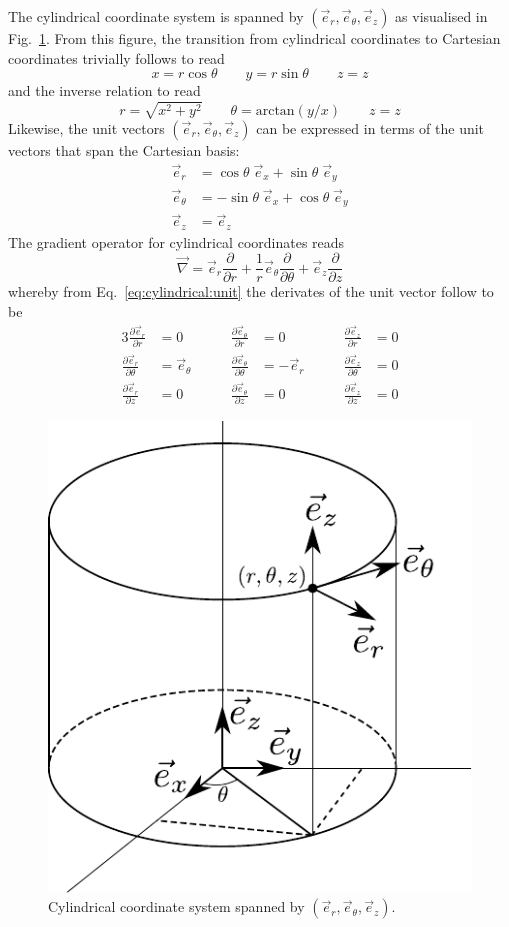 \documentclass[times,namecite]{goose-article}
\begin{document}
The cylindrical coordinate system is spanned by $(\vec{e}_r, \vec{e}_\theta, \vec{e}_z)$ as visualised in Fig.~\ref{fig:cylindrical}. From this figure, the transition from cylindrical coordinates to Cartesian coordinates trivially follows to read
\begin{equation}
  x = r \cos \theta \qquad
  y = r \sin \theta \qquad
  z = z
\end{equation}
and the inverse relation to read
\begin{equation}
  r      = \sqrt{ x^2 + y^2 }                \qquad
  \theta = \mathrm{arctan}\left( y/x \right) \qquad
  z      = z
\end{equation}
Likewise, the unit vectors $(\vec{e}_r, \vec{e}_\theta, \vec{e}_z)$ can be expressed in terms of the unit vectors that span the Cartesian basis:
\begin{align}
  \vec{e}_r      &=   \cos \theta \; \vec{e}_x + \sin \theta \; \vec{e}_y \nonumber \\
  \vec{e}_\theta &= - \sin \theta \; \vec{e}_x + \cos \theta \; \vec{e}_y \nonumber \\
  \vec{e}_z      &= \vec{e}_z \label{eq:cylindrical:unit}
\end{align}
The gradient operator for cylindrical coordinates reads
\begin{equation}
  \vec{\nabla} =
  \vec{e}_r \frac{\partial}{\partial r} +
  \frac{1}{r} \vec{e}_\theta \frac{\partial}{\partial \theta} +
  \vec{e}_z \frac{\partial}{\partial z}
\end{equation}
whereby from Eq.~\eqref{eq:cylindrical:unit} the derivates of the unit vector follow to be
\begin{alignat}{3}
  \frac{\partial \vec{e}_r}{\partial r     } &= 0              &\qquad \frac{\partial \vec{e}_\theta}{\partial r     } &= 0           &\qquad \frac{\partial \vec{e}_z}{\partial r     } &= 0 \nonumber \\
  \frac{\partial \vec{e}_r}{\partial \theta} &= \vec{e}_\theta &\qquad \frac{\partial \vec{e}_\theta}{\partial \theta} &= - \vec{e}_r &\qquad \frac{\partial \vec{e}_z}{\partial \theta} &= 0 \nonumber \\
  \frac{\partial \vec{e}_r}{\partial z     } &= 0              &\qquad \frac{\partial \vec{e}_\theta}{\partial z     } &= 0           &\qquad \frac{\partial \vec{e}_z}{\partial z     } &= 0
\end{alignat}

\begin{figure}[htp]
  \centering
  \includegraphics[width=.3\textwidth]{figures/cylindrical_coordinates}
  \caption{Cylindrical coordinate system spanned by $(\vec{e}_r, \vec{e}_\theta, \vec{e}_z)$.}
  \label{fig:cylindrical}
\end{figure}
\end{document}
